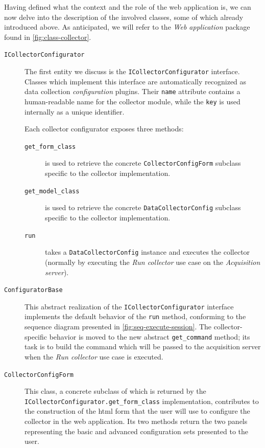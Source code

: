 Having defined what the context and the role of the web application is, we can now delve into the description of the involved classes, some of which already introduced above. As anticipated, we will refer to the \emph{Web application} package found in \vref{fig:class-collector}.

\begin{description}
  \item[\texttt{ICollectorConfigurator}] The first entity we discuss is the \texttt{ICollectorConfigurator} interface. Classes which implement this interface are automatically recognized as data collection \emph{configuration} plugins. Their \texttt{name} attribute contains a human-readable name for the collector module, while the \texttt{key} is used internally as a unique identifier.

    Each collector configurator exposes three methods:
    \begin{description}
      \item[\texttt{get\_form\_class}] is used to retrieve the concrete \texttt{CollectorConfigForm} subclass specific to the collector implementation.
      \item[\texttt{get\_model\_class}] is used to retrieve the concrete \texttt{DataCollectorConfig} subclass specific to the collector implementation.
      \item[\texttt{run}] takes a \texttt{DataCollectorConfig} instance and executes the collector (normally by executing the \emph{Run collector} use case on the \emph{Acquisition server}).
    \end{description}
  
  \item[\texttt{ConfiguratorBase}] This abstract realization of the \texttt{ICollectorConfigurator} interface implements the default behavior of the \texttt{run} method, conforming to the sequence diagram presented in \vref{fig:seq-execute-session}. The collector-specific behavior is moved to the new abstract \texttt{get\_command} method; its task is to build the command which will be passed to the acquisition server when the \emph{Run collector} use case is executed.

  \item[\texttt{CollectorConfigForm}] This class, a concrete subclass of which is returned by the \texttt{ICollector\BreakableSlash{}Configurator.get\_form\_class} implementation, contributes to the construction of the \gls{html} form that the user will use to configure the collector in the web application. Its two methods return the two panels representing the basic and advanced configuration sets presented to the user.


\end{description}
